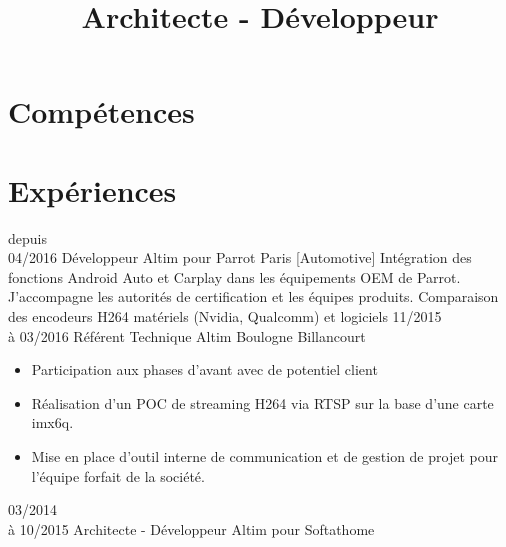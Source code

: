 \documentclass[10pt,a4paper]{moderncv}       %
\title{Architecte - Développeur}
\begin{document}
\maketitle

\section{Compétences}

\section{Expériences}
\cventry
{depuis\\04/2016}   %
{Développeur}       %
{Altim pour Parrot} %
{Paris}             %
{}                  %
{
  [Automotive] Intégration des fonctions Android Auto et
  Carplay dans les équipements OEM de Parrot. J'accompagne les autorités de
  certification et les équipes produits.
  \newline
  [Drone] Comparaison des encodeurs H264 matériels (Nvidia, Qualcomm) et
  logiciels
  \newline
}
\cventry
{11/2015\\à 03/2016}   %
{Référent Technique}   %
{Altim}                %
{Boulogne Billancourt} %
{}                     %
{
\begin{itemize}
  \item Participation aux phases d'avant avec de potentiel client
  \item Réalisation d'un POC de streaming H264 via RTSP sur la base d'une carte
  imx6q.
  \item Mise en place d'outil interne de communication et de gestion de projet
  pour l'équipe forfait de la société.
\end{itemize}
}
\cventry
{03/2014\\à 10/2015}       %
{Architecte - Développeur} %
{Altim pour Softathome}    %
\end{document}

